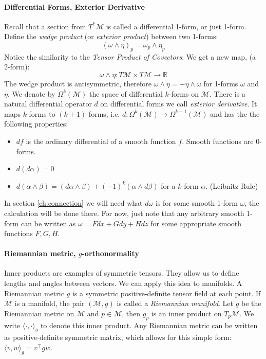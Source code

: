 \documentclass[../thesis.tex]{subfiles}
\begin{document}
\paragraph{Differential Forms, Exterior Derivative}
Recall that a section from $T^*\mathcal{M}$ is called a differential 1-form, or just 1-form.
Define the \emph{wedge product} (or \emph{exterior product}) between two 1-forms:
$$(\omega \wedge \eta)_p = \omega_p \wedge \eta_p$$
Notice the similarity to the \emph{Tensor Product of Covectors}: We get a new map, (a 2-form):
$$\omega \wedge \eta: T\mathcal{M} \times T\mathcal{M} \to \mathbb{R}$$
The wedge product is antisymmetric, therefore $\omega \wedge \eta = -\eta \wedge \omega$ for 1-forms $\omega$ and $\eta$.
We denote by $\Omega^k(\mathcal{M})$ the space of differential $k$-forms on $\mathcal{M}$.
There is a natural differential operator $d$ on differential forms we call \emph{exterior derivative}.
It maps $k$-forms to $(k+1)$-forms, i.e. $d: \Omega^k(\mathcal{M}) \to \Omega^{k+1}(\mathcal{M})$
and has the the following properties:
\begin{itemize}
  \item $df$ is the ordinary differential of a smooth function $f$. Smooth functions are 0-forms.
  \item $d(d\alpha) = 0$
  \item $d(\alpha \wedge \beta) = (d\alpha \wedge \beta) + (-1)^k(\alpha \wedge d\beta)$ for a $k$-form $\alpha$. (Leibnitz Rule)
\end{itemize}
In section \ref{ch:connection} we will need what $d\omega$ is for some smooth 1-form $\omega$, the calculation
will be done there. For now, just note that 
any arbitrary smooth 1-form can be written as $\omega = Fdx+Gdy+Hdz$ for some appropriate smooth functions $F,G,H$.


\paragraph{Riemannian metric, $g$-orthonormality}
Inner products are examples of symmetric tensors. They allow us to define lengths and angles
between vectors. We can apply this idea to manifolds.
A Riemannian metric $g$ is a symmetric positive-definite tensor field at each point.
If $\mathcal{M}$ is a manifold, the pair $(\mathcal{M},g)$ is called a \emph{Riemannian manifold}.
Let $g$ be the Riemannian metric on $\mathcal{M}$ and $p\in \mathcal{M}$,
then $g_p$ is an inner product on $T_p\mathcal{M}$. We write $\langle \cdot, \cdot\rangle_g$ to denote this inner product.
Any Riemannian metric can be written as positive-definite symmetric matrix, which allows for this simple form: $\langle v,w\rangle_g = v^{\top}gw$.
\end{document}
